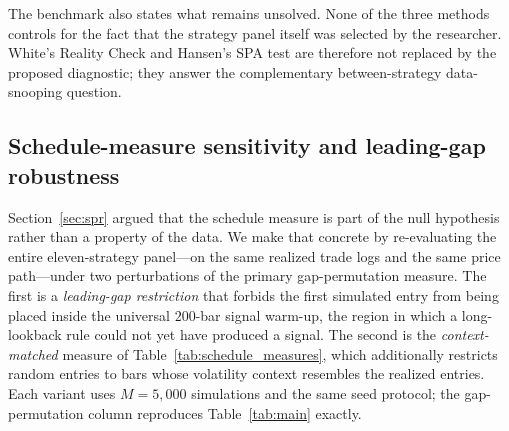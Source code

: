 \documentclass[preprint,12pt]{elsarticle}
\theoremstyle{definition}
\begin{document}
The benchmark also states what remains unsolved. None of the three methods controls for the fact that the strategy panel itself was selected by the researcher. White's Reality Check and Hansen's SPA test are therefore not replaced by the proposed diagnostic; they answer the complementary between-strategy data-snooping question.

\subsection{Schedule-measure sensitivity and leading-gap robustness}
\label{sec:schedule-sensitivity}

Section~\ref{sec:spr} argued that the schedule measure is part of the null hypothesis rather than a property of the data. We make that concrete by re-evaluating the entire eleven-strategy panel---on the same realized trade logs and the same price path---under two perturbations of the primary gap-permutation measure. The first is a \emph{leading-gap restriction} that forbids the first simulated entry from being placed inside the universal $200$-bar signal warm-up, the region in which a long-lookback rule could not yet have produced a signal. The second is the \emph{context-matched} measure of Table~\ref{tab:schedule_measures}, which additionally restricts random entries to bars whose volatility context resembles the realized entries. Each variant uses $M=5{,}000$ simulations and the same seed protocol; the gap-permutation column reproduces Table~\ref{tab:main} exactly.
\end{document}
